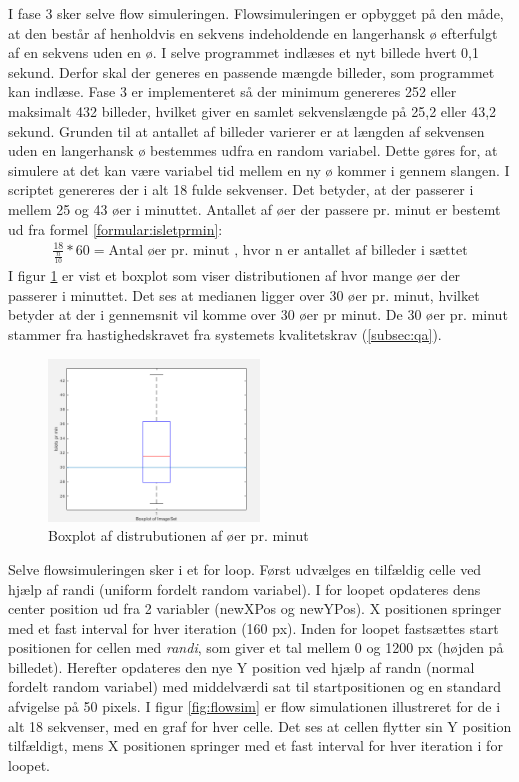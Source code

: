 I fase 3 sker selve flow simuleringen. Flowsimuleringen er opbygget på den måde, at den består af henholdvis en sekvens indeholdende en langerhansk ø efterfulgt af en sekvens uden en ø. I selve programmet indlæses et nyt billede hvert 0,1 sekund. Derfor skal der generes en passende mængde billeder, som programmet kan indlæse. Fase 3 er implementeret så der minimum genereres 252 eller maksimalt 432 billeder, hvilket giver en samlet sekvenslængde på 25,2 eller 43,2 sekund. Grunden til at antallet af billeder varierer er at længden af sekvensen uden en langerhansk ø bestemmes udfra en random variabel. Dette gøres for, at simulere at det kan være variabel tid mellem en ny ø kommer i gennem slangen. I scriptet genereres der i alt 18 fulde sekvenser. Det betyder, at der passerer i mellem 25 og 43 øer i minuttet. Antallet af øer der passere pr. minut er bestemt ud fra formel \ref{formular:isletprmin}: 
\begin{align}
\frac{18}{\frac{n}{10}} * 60 = \text{Antal øer pr. minut}
\text{ , hvor n er antallet af billeder i sættet}
\label{formular:isletprmin}
\end{align} 
I figur \ref{fig:boxplot} er vist et boxplot som viser distributionen af hvor mange øer der passerer i minuttet. Det ses at medianen ligger over 30 øer pr. minut, hvilket betyder at der i gennemsnit vil komme over 30 øer pr minut. De 30 øer pr. minut stammer fra hastighedskravet fra systemets kvalitetskrav (\ref{subsec:qa}).

 \begin{figure}[H]
	\centering
	\includegraphics[width=0.5\textwidth]{billeder/software/boxplot.png}
	\caption{Boxplot af distrubutionen af øer pr. minut}
	\label{fig:boxplot}
\end{figure}

Selve flowsimuleringen sker i et for loop. Først udvælges en tilfældig celle ved hjælp af randi (uniform fordelt random variabel). I for loopet opdateres dens center position ud fra 2 variabler (newXPos og newYPos). X positionen springer med et fast interval for hver iteration (160 px). Inden for loopet fastsættes start positionen for cellen med \textit{randi}, som giver et tal mellem 0 og 1200 px (højden på billedet). Herefter opdateres den nye Y position ved hjælp af randn (normal fordelt random variabel) med middelværdi sat til startpositionen og en standard afvigelse på 50 pixels. I figur \ref{fig:flowsim} er flow simulationen illustreret for de i alt 18 sekvenser, med en graf for hver celle. Det ses at cellen flytter sin Y position tilfældigt, mens X positionen springer med et fast interval for hver iteration i for loopet.

